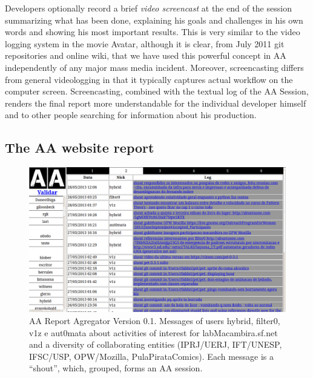 \documentclass{article}
\begin{document}
Developers optionally record a brief \emph{video screencast} at the end of the
session summarizing what has been done, explaining his goals and challenges
in his own words and showing his most important results. This is very similar to
the video logging system in the movie Avatar, although it is clear, from
July 2011 git repositories and online wiki, that we have used this powerful concept in AA independently of any major mass media incident. Moreover, screencasting differs
from general videologging in that it typically captures actual workflow on the
computer screen. Screencasting, combined with the textual log of the AA Session,
renders the final report more understandable for the individual developer
himself and to other people searching for information about his production.

\subsection{The AA website report}

\begin{figure}
\begin{center}
   \includegraphics[width=0.95\linewidth]{figs/aa-0_1_.png}
\end{center}
   \caption{AA Report Agregator Version 0.1. Messages of users hybrid, filter0,
   v1z e aut0mata about activities of interest for labMacambira.sf.net and
   a diversity of collaborating entities (IPRJ/UERJ, IFT/UNESP, IFSC/USP, OPW/Mozilla,
   PulaPirataComics). Each message is a ``shout'', which, grouped, forms an AA
   session.}
\label{fig:aaserver}
\end{figure}
\end{document}
